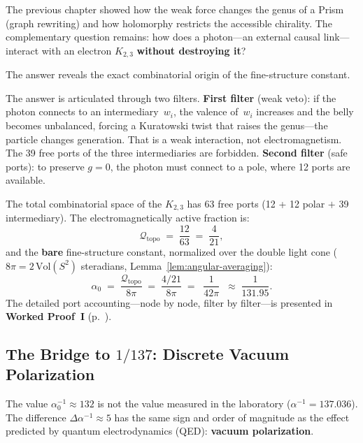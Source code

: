 The previous chapter showed how the weak force changes the
genus of a Prism (graph rewriting) and how holomorphy
restricts the accessible chirality. The complementary question remains:
how does a photon---an external causal link---interact with an
electron $K_{2,3}$ \textbf{without destroying it}?

The answer reveals the exact combinatorial origin of the fine-structure
constant.

The answer is articulated through two filters. \textbf{First filter} (weak
veto): if the photon connects to an intermediary~$w_i$, the valence
of~$w_i$ increases and the belly becomes unbalanced, forcing a Kuratowski
twist that raises the genus---the particle changes
generation. That is a weak interaction, not electromagnetism.
The 39 free ports of the three intermediaries are forbidden.
\textbf{Second filter} (safe ports): to preserve $g = 0$, the
photon must connect to a pole, where 12 ports are available.

The total combinatorial space of the $K_{2,3}$ has 63 free ports
(12 + 12 polar $+$ 39 intermediary). The
electromagnetically active fraction is:
\begin{equation}
  \mathcal{Q}_{\mathrm{topo}}
  \;=\; \frac{12}{63}
  \;=\; \frac{4}{21},
  \label{eq:qtopo-analytical}
\end{equation}
and the \textbf{bare} fine-structure constant, normalized over
the double light cone ($8\pi = 2\,\mathrm{Vol}(S^2)$ steradians,
Lemma~\ref{lem:angular-averaging}):
\begin{equation}
  \alpha_0
  \;=\; \frac{\mathcal{Q}_{\mathrm{topo}}}{8\pi}
  \;=\; \frac{4/21}{8\pi}
  \;=\; \boxed{\;\frac{1}{42\pi}\;}
  \;\approx\; \frac{1}{131{.}95}.
  \label{eq:alpha-bare}
\end{equation}
The detailed port accounting---node by node, filter by
filter---is presented in \textbf{Worked Proof~I}
(p.~\pageref{sec:demo-alpha}).

\subsection{The Bridge to $1/137$: Discrete Vacuum Polarization}
\label{subsec:vacuum-polarization}

The value $\alpha_0^{-1} \approx 132$ is not the value measured in the
laboratory ($\alpha^{-1} = 137{.}036$). The difference
$\Delta\alpha^{-1} \approx 5$ has the same sign and order of magnitude
as the effect predicted by quantum electrodynamics (QED):
\textbf{vacuum polarization}.

